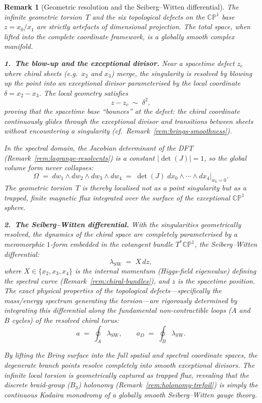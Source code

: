 \documentclass[12pt,a4paper]{report}
\newtheorem{remark}[theorem]{Remark}
\begin{document}
\begin{remark}[Geometric resolution and the Seiberg--Witten differential]
\label{rem:seiberg-witten}
The infinite geometric torsion~$T$ and the six topological defects on the
$\mathbb{CP}^1$ base $z=x_0/x_1$ are strictly artefacts of
dimensional projection.  The total space, when lifted into the
complete coordinate framework, is a globally smooth complex manifold.

\medskip
\noindent\textbf{1.~The blow-up and the exceptional divisor.}\;
Near a spacetime defect $z_c$ where chiral sheets (e.g.\ $x_2$ and
$x_3$) merge, the singularity is resolved by blowing up the point into
an exceptional divisor parameterised by the local coordinate
$\delta=x_2-x_3$.  The local geometry satisfies
\[
  z-z_c\;\sim\;\delta^2,
\]
proving that the spacetime base ``bounces'' at the defect: the chiral
coordinate continuously glides through the exceptional divisor and
transitions between sheets without encountering a singularity
(cf.\ Remark~\ref{rem:brings-smoothness}).

In the spectral domain, the Jacobian determinant of the DFT
(Remark~\ref{rem:lagrange-resolvents}) is a constant
$\lvert\det(J)\rvert=1$, so the global volume form never collapses:
\[
  \Omega \;=\; dw_1\wedge dw_2\wedge dw_3\wedge dw_4
  \;=\; \det(J)\;dx_0\wedge\cdots\wedge dx_4\Big|_{w_0=0}.
\]
The geometric torsion~$T$ is thereby localised not as a point
singularity but as a trapped, finite magnetic flux integrated over
the surface of the exceptional $\mathbb{CP}^1$ sphere.

\medskip
\noindent\textbf{2.~The Seiberg--Witten differential.}\;
With the singularities geometrically resolved, the dynamics of the chiral
space are completely parameterised by a meromorphic $1$-form embedded in
the cotangent bundle $T^{*}\mathbb{CP}^1$, the \emph{Seiberg--Witten
differential}:
\begin{equation}\label{eq:seiberg-witten-differential}
  \lambda_{\mathrm{SW}} \;=\; X\,dz,
\end{equation}
where $X\in\{x_2,x_3,x_4\}$ is the internal momentum (Higgs-field
eigenvalue) defining the spectral curve
(Remark~\ref{rem:chiral-bundles}), and $z$ is the spacetime position.
The exact physical properties of the topological defects---specifically
the mass/energy spectrum generating the torsion---are rigorously
determined by integrating this differential along the fundamental
non-contractible loops ($A$ and $B$ cycles) of the resolved chiral
torus:
\begin{equation}\label{eq:seiberg-witten-periods}
  a \;=\; \oint_{A}\lambda_{\mathrm{SW}},
  \qquad
  a_D \;=\; \oint_{B}\lambda_{\mathrm{SW}}.
\end{equation}

By lifting the Bring surface into the full spatial and spectral
coordinate spaces, the degenerate branch points resolve completely into
smooth exceptional divisors.  The infinite local torsion is geometrically
captured as trapped flux, revealing that the discrete braid-group
($B_3$) holonomy (Remark~\ref{rem:holonomy-trefoil}) is simply the
continuous Kodaira monodromy of a globally smooth Seiberg--Witten gauge
theory.
\end{remark}
\end{document}
